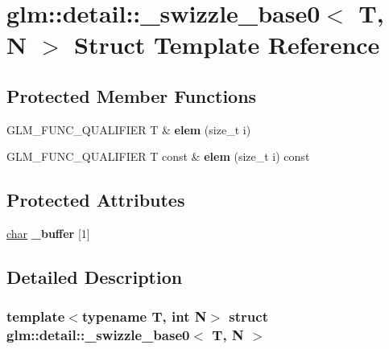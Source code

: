 \hypertarget{structglm_1_1detail_1_1__swizzle__base0}{}\section{glm\+:\+:detail\+:\+:\+\_\+swizzle\+\_\+base0$<$ T, N $>$ Struct Template Reference}
\label{structglm_1_1detail_1_1__swizzle__base0}
\subsection*{Protected Member Functions}
\begin{DoxyCompactItemize}
\item 
\mbox{\label{structglm_1_1detail_1_1__swizzle__base0_a4011ff1a445ccda72c385462106eb3ff}} 
G\+L\+M\+\_\+\+F\+U\+N\+C\+\_\+\+Q\+U\+A\+L\+I\+F\+I\+ER T \& {\bfseries elem} (size\+\_\+t i)
\item 
\mbox{\label{structglm_1_1detail_1_1__swizzle__base0_a495081f60b8fc565a5a35bfdd8b13c84}} 
G\+L\+M\+\_\+\+F\+U\+N\+C\+\_\+\+Q\+U\+A\+L\+I\+F\+I\+ER T const  \& {\bfseries elem} (size\+\_\+t i) const
\end{DoxyCompactItemize}
\subsection*{Protected Attributes}
\begin{DoxyCompactItemize}
\item 
\mbox{\label{structglm_1_1detail_1_1__swizzle__base0_afd4b7f15c9acff4cdef808f559ffec2d}} 
\hyperlink{classchar}{char} {\bfseries \+\_\+buffer} \mbox{[}1\mbox{]}
\end{DoxyCompactItemize}


\subsection{Detailed Description}
\subsubsection*{template$<$typename T, int N$>$\newline
struct glm\+::detail\+::\+\_\+swizzle\+\_\+base0$<$ T, N $>$}



